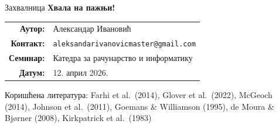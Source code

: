 \documentclass[aspectratio=169]{beamer}
\begin{document}
\begin{frame}{Захвалница}
  \centering
  \vspace{1.5cm}
  {\Large\bfseries Хвала на пажњи!}

  \vspace{1.5cm}
  \begin{tabular}{rl}
    \textbf{Аутор:} & Александар Ивановић \\
    \textbf{Контакт:} & \texttt{aleksandarivanovicmaster@gmail.com} \\
    \textbf{Семинар:} & Катедра за рачунарство и информатику \\
    \textbf{Датум:} & 12. април 2026. \\
  \end{tabular}

  \vspace{1.5cm}
  \small
  Коришћена литература: Farhi et al.\ (2014), Glover et al.\ (2022),
  McGeoch (2014), Johnson et al.\ (2011), Goemans \& Williamson (1995),
  de Moura \& Bjørner (2008), Kirkpatrick et al.\ (1983)
\end{frame}
\end{document}
